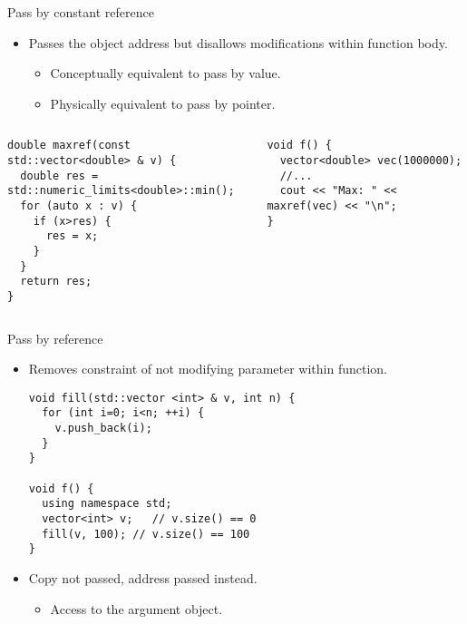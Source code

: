 \begin{frame}[t,fragile]{Pass by constant reference}
\begin{itemize}
\item Passes the object address but disallows modifications
      within function body.
  \begin{itemize}
    \item Conceptually equivalent to pass by value.
    \item Physically equivalent to pass by pointer.
  \end{itemize}
\end{itemize}

\begin{columns}[T]

\begin{lstlisting}
double maxref(const std::vector<double> & v) {
  double res = std::numeric_limits<double>::min();
  for (auto x : v) {
    if (x>res) {
      res = x;
    }
  }
  return res;
}
\end{lstlisting}

\begin{lstlisting}
void f() {
  vector<double> vec(1000000);
  //...
  cout << "Max: " << maxref(vec) << "\n";
}
\end{lstlisting}

\end{columns}
\end{frame}

\begin{frame}[t,fragile]{Pass by reference}
\begin{itemize}
  \item Removes constraint of not modifying parameter within function. 
\begin{lstlisting}
void fill(std::vector <int> & v, int n) {
  for (int i=0; i<n; ++i) {
    v.push_back(i);
  } 
}

void f() {
  using namespace std;
  vector<int> v;   // v.size() == 0
  fill(v, 100); // v.size() == 100
}
\end{lstlisting}

  \vfill
  \item Copy not passed, address passed instead.
    \begin{itemize}
      \item Access to the argument object.
    \end{itemize}
\end{itemize}
\end{frame}
